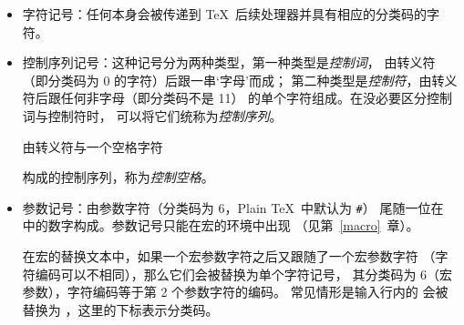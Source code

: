 \documentclass{book}
\begin{document}
\begin{itemize}
\item 字符记号：任何本身会被传递到 \TeX\ 后续处理器并具有相应的分类码的字符。
\item 控制序列记号：这种记号分为两种类型，第一种类型是{\em 控制词}，
由转义符（即分类码为 0 的字符）后跟一串`字母'而成；
第二种类型是{\em 控制符}，由转义符后跟任何非字母（即分类码不是 11）
的单个字符组成。在没必要区分控制词与控制符时，
可以将它们统称为{\em 控制序列}。

由转义符与一个空格字符 \csterm{}\par 构成的控制序列，称为{\em 控制空格}。

\item 参数记号：由参数字符（分类码为 6，Plain \TeX\ 中默认为 \verb=#=）%
尾随一位在  中的数字构成。参数记号只能在宏的环境中出现%
（见第~\ref{macro}~章）。

在宏的替换文本中，如果一个宏参数字符之后又跟随了一个宏参数字符%
（字符编码可以不相同），那么它们会被替换为单个字符记号，
其分类码为 6（宏参数），字符编码等于第 2 个参数字符的编码。
常见情形是输入行内的 \n{\#\#} 会被替换为 ，这里的下标表示分类码。

\end{itemize}

\end{document}

